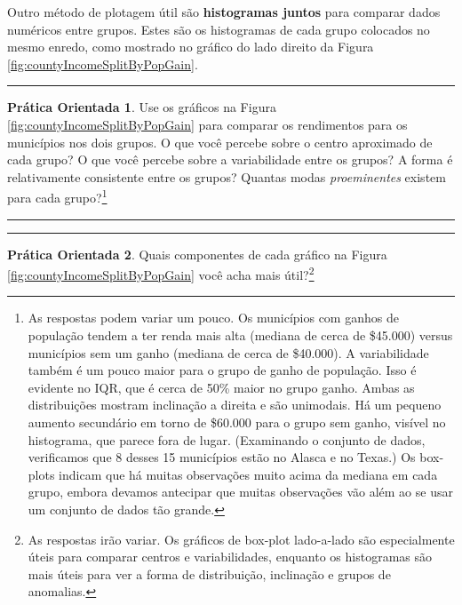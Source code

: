 \documentclass[
]{book}
\theoremstyle{definition}
\theoremstyle{definition}
\theoremstyle{definition}
\newtheorem{exercise}{Prática Orientada}[chapter]
\theoremstyle{definition}
\theoremstyle{remark}
\begin{document}
Outro método de plotagem útil são \textbf{histogramas juntos} para comparar dados numéricos entre grupos. Estes são os histogramas de cada grupo colocados no mesmo enredo, como mostrado no gráfico do lado direito da Figura \ref{fig:countyIncomeSplitByPopGain}.

\begin{center}\rule{0.5\linewidth}{0.5pt}\end{center}

\begin{exercise}
\protect\hypertarget{exr:comparingPriceByTypeExercise}{}{\label{exr:comparingPriceByTypeExercise} }Use os gráficos na Figura \ref{fig:countyIncomeSplitByPopGain} para comparar os rendimentos para os municípios nos dois grupos. O que você percebe sobre o centro aproximado de cada grupo? O que você percebe sobre a variabilidade entre os grupos? A forma é relativamente consistente entre os grupos? Quantas modas \emph{proeminentes} existem para cada grupo?\footnote{As respostas podem variar um pouco. Os municípios com ganhos de população tendem a ter renda mais alta (mediana de cerca de \$45.000) versus municípios sem um ganho (mediana de cerca de \$40.000). A variabilidade também é um pouco maior para o grupo de ganho de população. Isso é evidente no IQR, que é cerca de 50\% maior no grupo ganho. Ambas as distribuições mostram inclinação a direita e são unimodais. Há um pequeno aumento secundário em torno de \$60.000 para o grupo sem ganho, visível no histograma, que parece fora de lugar. (Examinando o conjunto de dados, verificamos que 8 desses 15 municípios estão no Alasca e no Texas.) Os box-plots indicam que há muitas observações muito acima da mediana em cada grupo, embora devamos antecipar que muitas observações vão além ao se usar um conjunto de dados tão grande.}
\end{exercise}

\begin{center}\rule{0.5\linewidth}{0.5pt}\end{center}

\begin{center}\rule{0.5\linewidth}{0.5pt}\end{center}

\begin{exercise}
\protect\hypertarget{exr:unnamed-chunk-39}{}{\label{exr:unnamed-chunk-39} }Quais componentes de cada gráfico na Figura \ref{fig:countyIncomeSplitByPopGain} você acha mais útil?\footnote{As respostas irão variar. Os gráficos de box-plot lado-a-lado são especialmente úteis para comparar centros e variabilidades, enquanto os histogramas são mais úteis para ver a forma de distribuição, inclinação e grupos de anomalias.}
\end{exercise}
\end{document}
